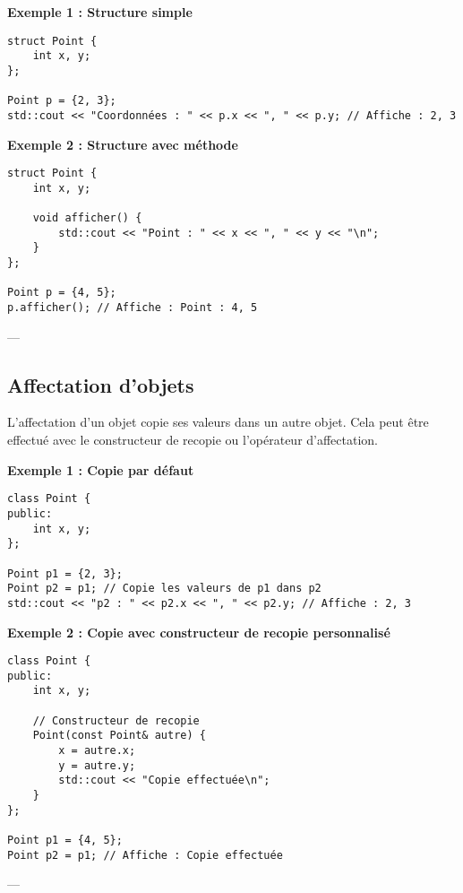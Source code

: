 \textbf{Exemple 1 : Structure simple}
\begin{tcolorbox}[colframe=blue!50!black, colback=blue!5!white, title=Exemple d'Attributs et Méthodes Statistiques, float=htb]
\begin{verbatim}
struct Point {
    int x, y;
};

Point p = {2, 3};
std::cout << "Coordonnées : " << p.x << ", " << p.y; // Affiche : 2, 3
\end{verbatim}
\end{tcolorbox}
\textbf{Exemple 2 : Structure avec méthode}
\begin{tcolorbox}[colframe=blue!50!black, colback=blue!5!white, title=Exemple d'Attributs et Méthodes Statistiques, float=htb]
\begin{verbatim}
struct Point {
    int x, y;

    void afficher() {
        std::cout << "Point : " << x << ", " << y << "\n";
    }
};

Point p = {4, 5};
p.afficher(); // Affiche : Point : 4, 5
\end{verbatim}
\end{tcolorbox}
---

\subsection{ Affectation d'objets}
L’affectation d’un objet copie ses valeurs dans un autre objet. Cela peut être effectué avec le constructeur de recopie ou l'opérateur d'affectation.

\textbf{Exemple 1 : Copie par défaut}
\begin{tcolorbox}[colframe=blue!50!black, colback=blue!5!white, title=Exemple d'Attributs et Méthodes Statistiques, float=htb]
\begin{verbatim}
class Point {
public:
    int x, y;
};

Point p1 = {2, 3};
Point p2 = p1; // Copie les valeurs de p1 dans p2
std::cout << "p2 : " << p2.x << ", " << p2.y; // Affiche : 2, 3
\end{verbatim}
\end{tcolorbox}
\textbf{Exemple 2 : Copie avec constructeur de recopie personnalisé}
\begin{tcolorbox}[colframe=blue!50!black, colback=blue!5!white, title=Exemple d'Attributs et Méthodes Statistiques, float=htb]
\begin{verbatim}
class Point {
public:
    int x, y;

    // Constructeur de recopie
    Point(const Point& autre) {
        x = autre.x;
        y = autre.y;
        std::cout << "Copie effectuée\n";
    }
};

Point p1 = {4, 5};
Point p2 = p1; // Affiche : Copie effectuée
\end{verbatim}
\end{tcolorbox}
---

